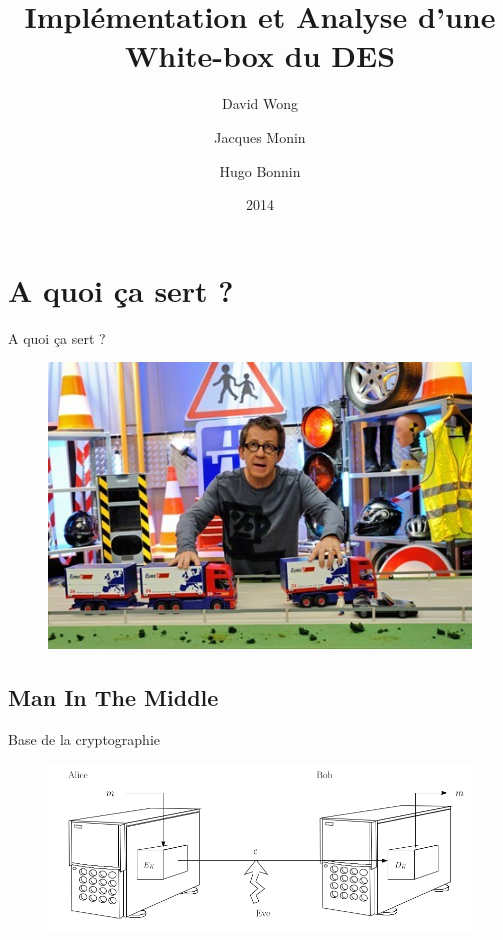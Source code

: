 \documentclass{beamer}
\author{David Wong
  \and Jacques Monin
  \and Hugo Bonnin}
\title{Implémentation et Analyse d'une White-box du DES}
\institute{Université de Bordeaux}
\date{2014}
\begin{document}
\begin{frame}
  \titlepage
\end{frame}



\section{A quoi ça sert ?}

\begin{frame}{A quoi ça sert ?}

  \begin{figure}[h]
    \centering
    \includegraphics[scale=0.6]{./images/kezako.jpg}
  \end{figure}

\end{frame}

\subsection{Man In The Middle}

\begin{frame}{Base de la cryptographie}

  \begin{figure}[h]
    \centering
    \includegraphics[scale=0.50]{./images/alice_bob.png}
  \end{figure}

\end{frame}
\end{document}
